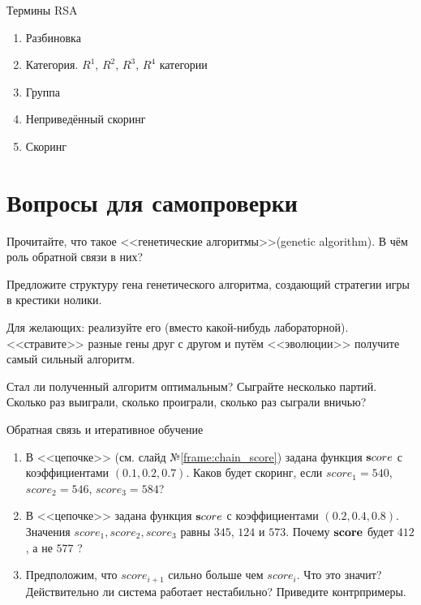 \begin{frame}
	\Large
\end{frame}

\begin{frame}{Термины RSA}\label{frame:rsa_risk_engine_terms}
	\begin{enumerate}
		\item Разбиновка 
		\item Категория. $R^1$, $R^2$, $R^3$, $R^4$ категории
		\item Группа
		\item Неприведённый скоринг
		\item Скоринг
	\end{enumerate}
\end{frame}


  
\section{Вопросы для самопроверки}

\begin{frame}
	Прочитайте, что такое <<генетические алгоритмы>>(genetic algorithm).
	В чём роль обратной связи в них?
	
	Предложите структуру гена генетического алгоритма, создающий стратегии игры в крестики нолики. 
	
	Для желающих: реализуйте его (вместо какой-нибудь лабораторной). 
	<<стравите>> разные гены друг с другом и путём <<эволюции>>
	получите самый сильный алгоритм.
	
	Стал ли полученный алгоритм оптимальным? Сыграйте несколько партий. Сколько раз выиграли, 
	сколько проиграли, сколько раз сыграли вничью?
	
\end{frame}

\begin{frame}{Обратная связь и итеративное обучение}
	\begin{enumerate}
		\item В <<цепочке>> (см. слайд №\ref{frame:chain_score}) задана функция
		$\bold score$ с коэффициентами $(0.1, 0.2, 0.7)$. Каков будет скоринг, 
		если $score_1=540$, $score_2=546$, $score_3=584$?
		\item В <<цепочке>> задана функция 	$\bold score$ 
		с коэффициентами $(0.2, 0.4, 0.8)$. Значения $score_1, score_2, score_3$
		равны $345$, $124$ и $573$. Почему $\bold {score}$ 
		будет $412$, 
		а не $577$ ?
		\item Предположим, что $score_{i+1}$ 
		сильно больше чем $score_i$. Что это значит? 
		Действительно ли система работает нестабильно? 
		Приведите контрпримеры.
		
	\end{enumerate}
\end{frame}

